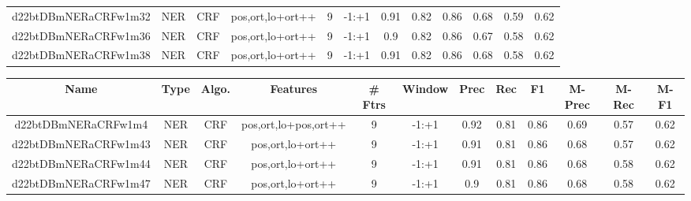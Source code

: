 \documentclass[a4paper]{article}
\begin{document}
\begin{landscape}
\begin{center}
\begin{tabular}{ |c|c|c|c|c|c|c|c|c|c|c|c|}
 
 	
 	\small{ d22btDBmNERaCRFw1m32 } & \small{ NER} & \small{  CRF }  & pos,ort,lo+ort++  &  9 &  \small{  -1:+1 }  &  0.91 & 0.82 & 0.86  &  0.68 & 0.59 & 0.62 \\
 	

 
 	
 	\small{ d22btDBmNERaCRFw1m36 } & \small{ NER} & \small{  CRF }  & pos,ort,lo+ort++  &  9 &  \small{  -1:+1 }  &  0.9 & 0.82 & 0.86  &  0.67 & 0.58 & 0.62 \\
 	

 
 	
 	\small{ d22btDBmNERaCRFw1m38 } & \small{ NER} & \small{  CRF }  & pos,ort,lo+ort++  &  9 &  \small{  -1:+1 }  &  0.91 & 0.82 & 0.86  &  0.68 & 0.58 & 0.62 \\
 	
 \hline
\end{tabular}
\end{center}




\begin{center}
\begin{tabular}{ |c|c|c|c|c|c|c|c|c|c|c|c|} 
 \hline
 	Name & Type & Algo. & Features & \# Ftrs & Window & Prec & Rec & F1 & M-Prec & M-Rec & M-F1\\
 \hline

 	

 
 	
 	\small{ d22btDBmNERaCRFw1m4 } & \small{ NER} & \small{  CRF }  & pos,ort,lo+pos,ort++  &  9 &  \small{  -1:+1 }  &  0.92 & 0.81 & 0.86  &  0.69 & 0.57 & 0.62 \\
 	

 
 	
 	\small{ d22btDBmNERaCRFw1m43 } & \small{ NER} & \small{  CRF }  & pos,ort,lo+ort++  &  9 &  \small{  -1:+1 }  &  0.91 & 0.81 & 0.86  &  0.68 & 0.57 & 0.62 \\
 	

 
 	
 	\small{ d22btDBmNERaCRFw1m44 } & \small{ NER} & \small{  CRF }  & pos,ort,lo+ort++  &  9 &  \small{  -1:+1 }  &  0.91 & 0.81 & 0.86  &  0.68 & 0.58 & 0.62 \\
 	

 
 	
 	\small{ d22btDBmNERaCRFw1m47 } & \small{ NER} & \small{  CRF }  & pos,ort,lo+ort++  &  9 &  \small{  -1:+1 }  &  0.9 & 0.81 & 0.86  &  0.68 & 0.58 & 0.62 \\
 	

 
 	

\end{tabular}
\end{center}
\end{landscape}
\end{document}
